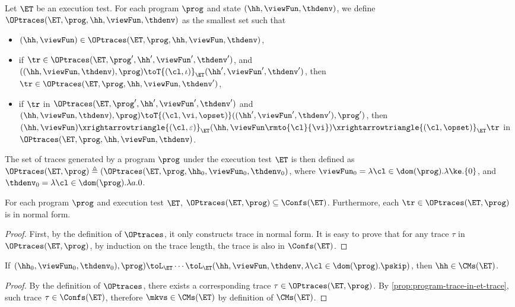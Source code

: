\begin{definition}
Let $\ET$ be an execution test. For each program $\prog$ and state 
$(\hh, \viewFun, \thdenv)$, we define $\OPtraces(\ET, \prog, \hh, \viewFun, \thdenv)$ 
as the smallest set such that 
\begin{itemize}
\item $(\hh, \viewFun) \in \OPtraces(\ET, \prog, \hh, \viewFun, \thdenv)$, 
\item if $\tr \in \OPtraces(\ET, \prog', \hh', \viewFun',\thdenv')$, 
and $((\hh, \viewFun, \thdenv) , \prog) \toT{(\cl, \iota)}_{\ET} (\hh', \viewFun', \thdenv')$, 
then $\tr \in \OPtraces(\ET, \prog, \hh, \viewFun, \thdenv')$, 
\item if $\tr$ in $\OPtraces(\ET, \prog', \hh', \viewFun', \thdenv')$ and 
\newline $(\hh, \viewFun, \thdenv), \prog) \toT{(\cl, \vi, \opset)} ((\hh', \viewFun', \thdenv'), \prog')$,  
then $(\hh, \viewFun) \xrightarrowtriangle{(\cl, \varepsilon)}_{\ET} (\hh, \viewFun\rmto{\cl}{\vi}) 
\xrightarrowtriangle{(\cl, \opset)}_{\ET} \tr$ in $\OPtraces(\ET, \prog, \hh, \viewFun, \thdenv)$. 
\end{itemize}

The set of traces generated by a program $\prog$ under the execution test $\ET$ is 
then defined as $\OPtraces(\ET, \prog) \triangleq (\OPtraces(\ET, \prog, \hh_{0}, \viewFun_{0}, 
\thdenv_{0})$, where $\viewFun_{0} = \lambda \cl \in \dom(\prog).\lambda \ke.\{0\}$, and 
$\thdenv_{0} = \lambda \cl \in \dom(\prog).\lambda a.0$.

\end{definition}

\begin{proposition}
    \label{prop:program-trace-in-et-trace}
For each program $\prog$ and execution test $\ET$, 
$\OPtraces(\ET, \prog) \subseteq \Confs(\ET)$. 
Furthermore, each $\tr \in \OPtraces(\ET, \prog)$ is in normal form. 
\end{proposition}
\begin{proof}
    First, by the definition of \( \OPtraces \), 
    it only constructs trace in normal form.
    It is easy to prove that for any trace \( \tau \) in \( \OPtraces(\ET, \prog) \), by induction on the trace length,
    the trace is also in \( \Confs(\ET) \).
\end{proof}

\begin{corollary}
If $(\hh_{0}, \viewFun_{0}, \thdenv_{0}), \prog) \toL_{\ET} \cdots \toL_{\ET} 
(\hh, \viewFun, \thdenv, \lambda \cl \in \dom(\prog). \pskip)$, then $\hh \in \CMs(\ET)$.
\end{corollary}
\begin{proof}
    By the definition of \( \OPtraces \), 
    there exists a corresponding trace \( \tau \in \OPtraces(\ET, \prog) \).
    By \cref{prop:program-trace-in-et-trace}, such trace \( \tau \in \Confs(\ET) \),
    therefore \( \mkvs \in \CMs(\ET)\) by definition of \( \CMs(\ET) \).
\end{proof}

